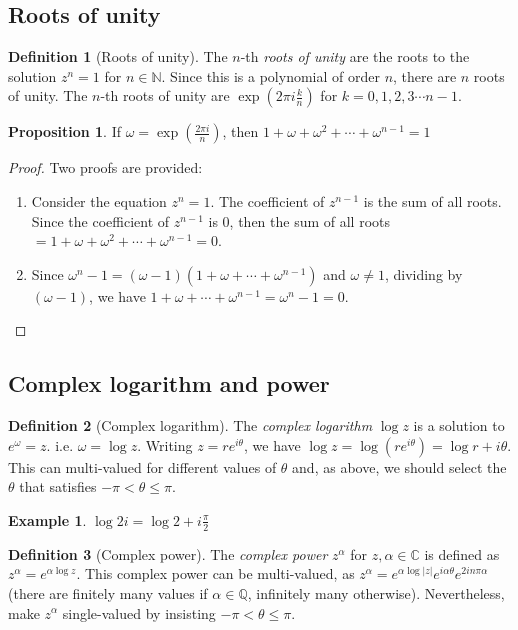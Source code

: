 \documentclass[a4paper]{article}
\theoremstyle{definition}
\newtheorem*{prop}{Proposition}
\newtheorem*{defi}{Definition}
\newtheorem*{eg}{Example}
\newcommand{\N}{\mathbb{N}}
\newcommand{\Q}{\mathbb{Q}}
\newcommand{\C}{\mathbb{C}}
\begin{document}
\subsection{Roots of unity}
\begin{defi}[Roots of unity]
  The $n$-th \emph{roots of unity} are the roots to the solution $z^n = 1$ for $n\in \N$. Since this is a polynomial of order $n$, there are $n$ roots of unity. The $n$-th roots of unity are $\exp\left(2\pi i\frac{k}{n}\right)$ for $k = 0, 1, 2, 3\cdots n - 1$.
\end{defi}

\begin{prop}
  If $\omega = \exp\left(\frac{2\pi i}{n}\right)$, then $1 + \omega + \omega^2 + \cdots + \omega^{n - 1} = 1$
\end{prop}

\begin{proof}
  Two proofs are provided:
  \begin{enumerate}
  \item Consider the equation $z^n = 1$. The coefficient of $z^{n-1}$ is the sum of all roots. Since the coefficient of $z^{n-1}$ is 0, then the sum of all roots $= 1 + \omega + \omega^2 + \cdots + \omega^{n-1} = 0$.
  \item Since $\omega^n - 1 = (\omega - 1)(1 + \omega + \cdots + \omega^{n - 1})$ and $\omega \not= 1$, dividing by $(\omega - 1)$, we have $1 + \omega + \cdots + \omega^{n-1} = \omega^n - 1 = 0$.
  \end{enumerate}
\end{proof}

\subsection{Complex logarithm and power}
\begin{defi}[Complex logarithm]
  The \emph{complex logarithm} $\log z$ is a solution to $e^\omega = z$. i.e. $\omega = \log z$. Writing $z = re^{i\theta}$, we have $\log z = \log(re^{i\theta}) = \log r + i\theta$. This can multi-valued for different values of $\theta$ and, as above, we should select the $\theta$ that satisfies $-\pi < \theta \leq \pi$.
\end{defi}
\begin{eg}
  $\log 2i = \log 2 + i\frac{\pi}{2}$
\end{eg}

\begin{defi}[Complex power]
  The \emph{complex power} $z^\alpha$ for $z, \alpha\in \C$ is defined as $z^\alpha = e^{\alpha\log z}$. This complex power can be multi-valued, as $z^\alpha = e^{\alpha\log|z|}e^{i\alpha\theta}e^{2in\pi\alpha}$ (there are finitely many values if $\alpha\in\Q$, infinitely many otherwise). Nevertheless, make $z^\alpha$ single-valued by insisting $-\pi < \theta \leq \pi$.
\end{defi}
\end{document}
